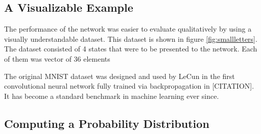 \documentclass[11pt]{article}
\begin{document}
	\subsection{A Visualizable Example}
	The performance of the network was easier to evaluate qualitatively by using a visually understandable dataset. This dataset is shown in figure \ref{fig:smallletters}. The dataset consisted of 4 states that were to be presented to the network. Each of them was vector of 36 elements
	
	


	The original MNIST dataset was designed and used by LeCun in the first convolutional neural network fully trained via backpropagation in [CITATION]. It has become a standard benchmark in machine learning ever since. 


	\subsection{Computing a Probability Distribution}
	
	
	
		
\end{document}
